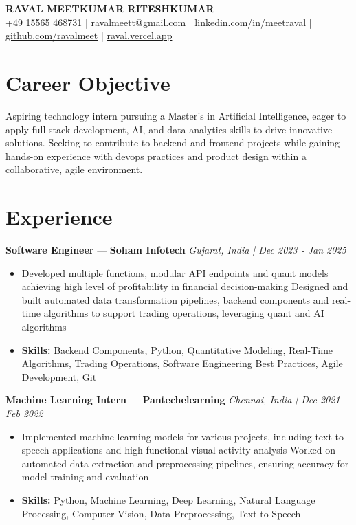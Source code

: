 \documentclass[a4paper,10pt]{article}
\begin{document}
\begin{center}
  {\Large\bfseries RAVAL MEETKUMAR RITESHKUMAR}\\[2pt]
  {\small +49 15565 468731 \;|\; \href{mailto:ravalmeett@gmail.com}{ravalmeett@gmail.com} \;|\; \href{https://www.linkedin.com/in/meetraval/}{linkedin.com/in/meetraval} \;|\; \href{https://github.com/ravalmeet}{github.com/ravalmeet} \;|\; \href{https://raval.vercel.app/}{raval.vercel.app}}
\end{center}
\vspace{-3pt}

\section*{Career Objective}
Aspiring technology intern pursuing a Master's in Artificial Intelligence, eager to apply full-stack development, AI, and data analytics skills to drive innovative solutions. Seeking to contribute to backend and frontend projects while gaining hands-on experience with devops practices and product design within a collaborative, agile environment.\par

\section*{Experience}
\textbf{Software Engineer} — \textbf{Soham Infotech} \hfill \textit{Gujarat, India \;|\; Dec 2023 - Jan 2025}\par
\vspace{1pt}
\begin{itemize}
  \item Developed multiple functions, modular API endpoints and quant models achieving high level of profitability in financial decision-making Designed and built automated data transformation pipelines, backend components and real-time algorithms to support trading operations, leveraging quant and AI algorithms
  \item \textbf{Skills:} Backend Components, Python, Quantitative Modeling, Real-Time Algorithms, Trading Operations, Software Engineering Best Practices, Agile Development, Git
\end{itemize}
\vspace{3pt}
\textbf{Machine Learning Intern} — \textbf{Pantechelearning} \hfill \textit{Chennai, India \;|\; Dec 2021 - Feb 2022}\par
\vspace{1pt}
\begin{itemize}
  \item Implemented machine learning models for various projects, including text-to-speech applications and high functional visual-activity analysis Worked on automated data extraction and preprocessing pipelines, ensuring accuracy for model training and evaluation
  \item \textbf{Skills:} Python, Machine Learning, Deep Learning, Natural Language Processing, Computer Vision, Data Preprocessing, Text-to-Speech
\end{itemize}
\end{document}
